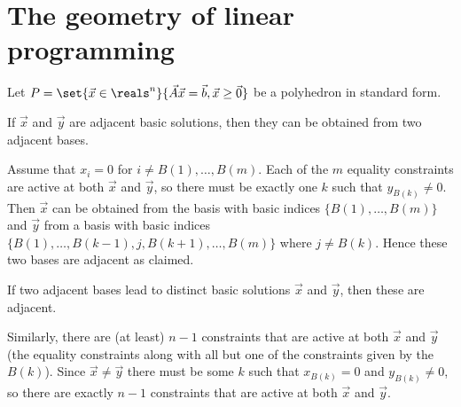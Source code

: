 \documentclass[article, a4paper, 11pt, oneside]{memoir}
\title{\doctitle}
\author{\docauthor}
\numberwithin{equation}{chapter}
\theoremstyle{nonumberplain}
\newenvironment{displaytheorem}{%
	\begin{displayquote}\itshape%
}{%
	\end{displayquote}%
}
\begin{document}
\maketitle

\addtocounter{chapter}{1}
\chapter{The geometry of linear programming}

\newcommand{\keyword}[1]{{\bfseries \textit{#1}}}
\newcommand{\mat}{\vec}


\begin{remarkbreak}
    Let $P = \set{\vec{x} \in \reals^n}{\mat{A}\vec{x} = \vec{b}, \vec{x} \geq \vec{0}}$ be a polyhedron in standard form.
    \begin{displaytheorem}
        If $\vec{x}$ and $\vec{y}$ are adjacent basic solutions, then they can be obtained from two adjacent bases.
    \end{displaytheorem}
    Assume that $x_i = 0$ for $i \neq B(1), \ldots, B(m)$. Each of the $m$ equality constraints are active at both $\vec{x}$ and $\vec{y}$, so there must be exactly one $k$ such that $y_{B(k)} \neq 0$. Then $\vec{x}$ can be obtained from the basis with basic indices $\{B(1), \ldots, B(m)\}$ and $\vec{y}$ from a basis with basic indices $\{B(1), \ldots, B(k-1), j, B(k+1), \ldots, B(m)\}$ where $j \neq B(k)$. Hence these two bases are adjacent as claimed.

    \begin{displaytheorem}
        If two adjacent bases lead to distinct basic solutions $\vec{x}$ and $\vec{y}$, then these are adjacent.
    \end{displaytheorem}
    Similarly, there are (at least) $n-1$ constraints that are active at both $\vec{x}$ and $\vec{y}$ (the equality constraints along with all but one of the constraints given by the $B(k)$). Since $\vec{x} \neq \vec{y}$ there must be some $k$ such that $x_{B(k)} = 0$ and $y_{B(k)} \neq 0$, so there are exactly $n-1$ constraints that are active at both $\vec{x}$ and $\vec{y}$.
\end{remarkbreak}
\end{document}
